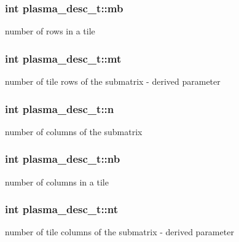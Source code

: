 \subsubsection[{mb}]{\setlength{\rightskip}{0pt plus 5cm}int plasma\+\_\+desc\+\_\+t\+::mb}\label{structplasma__desc__t_a8512ed221aec5b7db0e31d02acc5b5c7_a8512ed221aec5b7db0e31d02acc5b5c7}
number of rows in a tile \hypertarget{structplasma__desc__t_a35d0d7ad5f5927bb551a357a174152c2_a35d0d7ad5f5927bb551a357a174152c2}{}
\subsubsection[{mt}]{\setlength{\rightskip}{0pt plus 5cm}int plasma\+\_\+desc\+\_\+t\+::mt}\label{structplasma__desc__t_a35d0d7ad5f5927bb551a357a174152c2_a35d0d7ad5f5927bb551a357a174152c2}
number of tile rows of the submatrix -\/ derived parameter \hypertarget{structplasma__desc__t_a1deb8d67b1fca78449a40ba7a056cafd_a1deb8d67b1fca78449a40ba7a056cafd}{}
\subsubsection[{n}]{\setlength{\rightskip}{0pt plus 5cm}int plasma\+\_\+desc\+\_\+t\+::n}\label{structplasma__desc__t_a1deb8d67b1fca78449a40ba7a056cafd_a1deb8d67b1fca78449a40ba7a056cafd}
number of columns of the submatrix \hypertarget{structplasma__desc__t_af3770d8c57330e1e22a149f46cddb272_af3770d8c57330e1e22a149f46cddb272}{}
\subsubsection[{nb}]{\setlength{\rightskip}{0pt plus 5cm}int plasma\+\_\+desc\+\_\+t\+::nb}\label{structplasma__desc__t_af3770d8c57330e1e22a149f46cddb272_af3770d8c57330e1e22a149f46cddb272}
number of columns in a tile \hypertarget{structplasma__desc__t_a7595a9db8b1b8360b5fa9726b998a117_a7595a9db8b1b8360b5fa9726b998a117}{}
\subsubsection[{nt}]{\setlength{\rightskip}{0pt plus 5cm}int plasma\+\_\+desc\+\_\+t\+::nt}\label{structplasma__desc__t_a7595a9db8b1b8360b5fa9726b998a117_a7595a9db8b1b8360b5fa9726b998a117}
number of tile columns of the submatrix -\/ derived parameter 